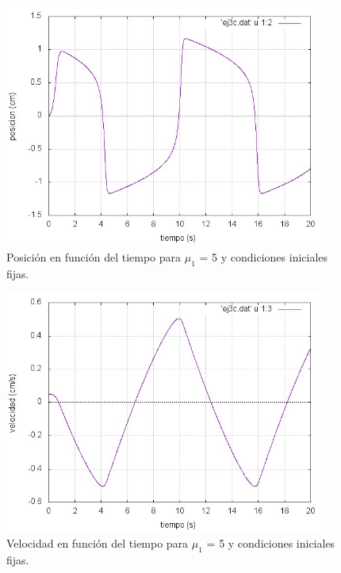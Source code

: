 \documentclass[a4paper,12pt]{article}
\begin{document}
\begin{itemize}
\begin{figure}[H]
\begin{center}
\includegraphics[height=8cm]{grafico_ej3c_xVSt.jpg}
\caption[width=5cm]{Posici\'on en funci\'on del tiempo para $\mu_1$ = 5 y condiciones iniciales fijas.}
\end{center}
\end{figure}

\begin{figure}[H]
\begin{center}
\includegraphics[height=8cm]{grafico_ej3c_vVSt.jpg}
\caption[width=5cm]{Velocidad en funci\'on del tiempo para $\mu_1$ = 5 y condiciones iniciales fijas.}
\end{center}
\end{figure}


\end{itemize}
\end{document}
